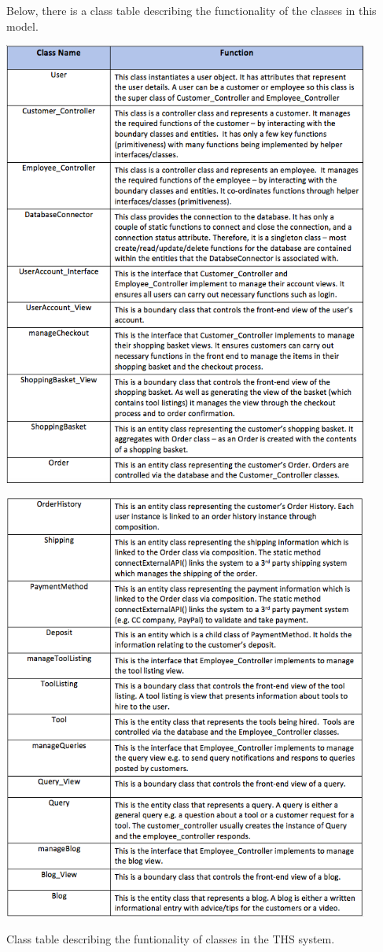 Below, there is a class table describing the functionality of the
classes in this model.

\begin{table}[H]
      \centering
      \includegraphics[trim = 0 0 0 0, clip, width=0.9\textwidth]{TempImg/CT1.png}
\end{table}

\begin{table}[H]
      \centering
      \includegraphics[trim = 0 0 0 0, clip, width=0.9\textwidth]{TempImg/CT2.png}
      \caption{Class table describing the funtionality of classes in the THS system.}
\end{table}

